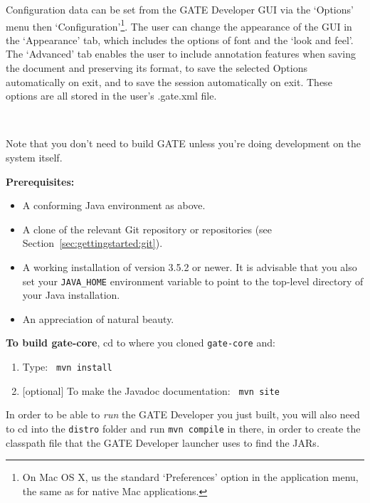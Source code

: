 Configuration data can be set from the GATE Developer GUI via the
`Options' menu then `Configuration'\footnote{On Mac OS X, us the standard
`Preferences' option in the application menu, the same as for native Mac
applications.}. The user can change the appearance of the GUI in the
`Appearance' tab, which includes the options of font and the `look and feel'.
The `Advanced' tab enables the user to include annotation features when saving
the document and preserving its format, to save the selected Options
automatically on exit, and to save the session automatically on exit. These
options are all stored in the user's .gate.xml file.



\mbox{ }

Note that you don't need to build GATE unless you're doing development
on the system itself.

{\bf Prerequisites:}
\begin{itemize}
\item
A conforming Java environment as above.
\item
A clone of the relevant Git repository or repositories (see Section~\ref{sec:gettingstarted:git}).
\item 
A working installation of  version
3.5.2 or newer. It is advisable that you also set your \verb!JAVA_HOME!
environment variable to point to the top-level directory of your Java
installation.
\item
An appreciation of natural beauty.
\end{itemize}

{\bf To build gate-core}, cd to where you cloned {\tt gate-core} and: 
\begin{enumerate}
\item
Type: {\tt \newline
mvn install
}
\item
$[$optional$]$ To make the Javadoc documentation:
{\tt \newline
mvn site
}
\end{enumerate}

In order to be able to \emph{run} the GATE Developer you just built, you will
also need to cd into the \verb!distro! folder and run \verb!mvn compile! in
there, in order to create the classpath file that the GATE Developer launcher
uses to find the JARs.

